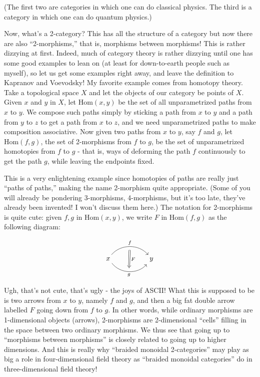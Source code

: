 \documentclass{article}
\begin{document}
(The first two are categories in which one can do classical physics. The
third is a category in which one can do quantum physics.)

Now, what's a 2-category? This has all the structure of a category but
now there are also ``2-morphisms,'' that is, morphisms between
morphisms! This is rather dizzying at first. Indeed, much of category
theory is rather dizzying until one has some good examples to lean on
(at least for down-to-earth people such as myself), so let us get some
examples right away, and leave the definition to Kapranov and Voevodsky!
My favorite example comes from homotopy theory. Take a topological space
\(X\) and let the objects of our category be points of \(X\). Given
\(x\) and \(y\) in \(X\), let \(\mathrm{Hom}(x,y)\) be the set of all
unparametrized paths from \(x\) to \(y\). We compose such paths simply
by sticking a path from \(x\) to \(y\) and a path from \(y\) to \(z\) to
get a path from \(x\) to \(z\), and we need unparametrized paths to make
composition associative. Now given two paths from \(x\) to \(y\), say
\(f\) and \(g\), let \(\mathrm{Hom}(f,g)\), the set of 2-morphisms from
\(f\) to \(g\), be the set of unparametrized homotopies from \(f\) to
\(g\) - that is, ways of deforming the path \(f\) continuously to get
the path \(g\), while leaving the endpoints fixed.

This is a very enlightening example since homotopies of paths are really
just ``paths of paths,'' making the name 2-morphism quite appropriate.
(Some of you will already be pondering 3-morphisms, 4-morphisms, but
it's too late, they've already been invented! I won't discuss them
here.) The notation for 2-morphisms is quite cute: given \(f,g\) in
\(\mathrm{Hom}(x,y)\), we write \(F\) in \(\mathrm{Hom}(f,g)\) as the
following diagram:

\[
  \begin{tikzcd}[sep=huge]
    x
      \rar[bend left=50,"f"{name=U}]
      \rar[bend right=50,swap,"g"{name=D}]
    & y
      \arrow[Rightarrow,shorten=5pt,from=U,to=D,"F"]
  \end{tikzcd}
\]

Ugh, that's not cute, that's ugly - the joys of ASCII! What this is
supposed to be is two arrows from \(x\) to \(y\), namely \(f\) and
\(g\), and then a big fat double arrow labelled \(F\) going down from
\(f\) to \(g\). In other words, while ordinary morphisms are
1-dimensional objects (arrows), 2-morphisms are 2-dimensional ``cells''
filling in the space between two ordinary morphisms. We thus see that
going up to ``morphisms between morphisms'' is closely related to going
up to higher dimensions. And this is really why ``braided monoidal
2-categories'' may play as big a role in four-dimensional field theory
as ``braided monoidal categories'' do in three-dimensional field theory!
\end{document}
